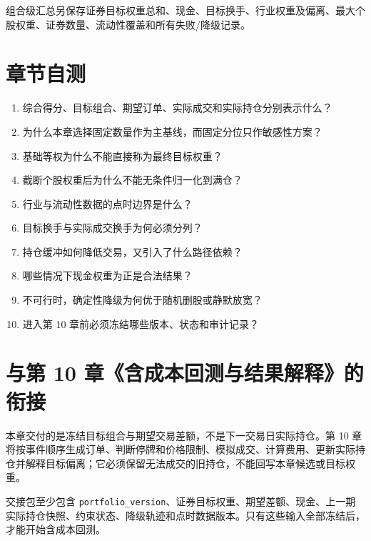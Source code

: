 组合级汇总另保存证券目标权重总和、现金、目标换手、行业权重及偏离、最大个股权重、证券数量、流动性覆盖和所有失败/降级记录。

\section{章节自测}

\begin{quizbox}
\begin{enumerate}
  \item 综合得分、目标组合、期望订单、实际成交和实际持仓分别表示什么？
  \item 为什么本章选择固定数量作为主基线，而固定分位只作敏感性方案？
  \item 基础等权为什么不能直接称为最终目标权重？
  \item 截断个股权重后为什么不能无条件归一化到满仓？
  \item 行业与流动性数据的点时边界是什么？
  \item 目标换手与实际成交换手为何必须分列？
  \item 持仓缓冲如何降低交易，又引入了什么路径依赖？
  \item 哪些情况下现金权重为正是合法结果？
  \item 不可行时，确定性降级为何优于随机删股或静默放宽？
  \item 进入第 10 章前必须冻结哪些版本、状态和审计记录？
\end{enumerate}
\end{quizbox}

\section{与第 10 章《含成本回测与结果解释》的衔接}

本章交付的是冻结目标组合与期望交易差额，不是下一交易日实际持仓。第 10 章将按事件顺序生成订单、判断停牌和价格限制、模拟成交、计算费用、更新实际持仓并解释目标偏离；它必须保留无法成交的旧持仓，不能回写本章候选或目标权重。

交接包至少包含 \texttt{portfolio\_version}、证券目标权重、期望差额、现金、上一期实际持仓快照、约束状态、降级轨迹和点时数据版本。只有这些输入全部冻结后，才能开始含成本回测。
